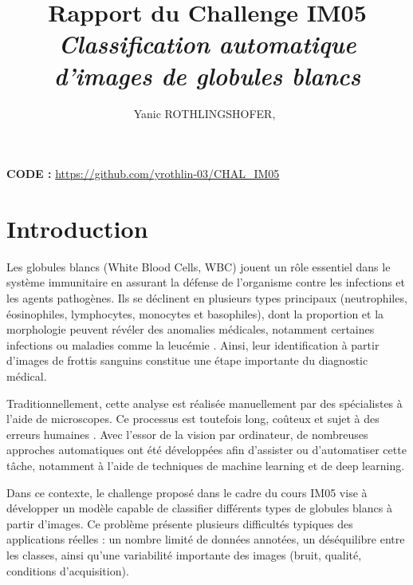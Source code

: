 \documentclass[journal,twocolumn]{IEEEtran}
\begin{document}
\title{Rapport du Challenge IM05 \\ \textit{Classification automatique d’images de globules blancs}}
\author{
  Yanic ROTHLINGSHOFER,~
}

\maketitle




\textbf{CODE :} \url{https://github.com/yrothlin-03/CHAL_IM05}

\section{Introduction}

Les globules blancs (White Blood Cells, WBC) jouent un rôle essentiel dans le système immunitaire en assurant la défense de l’organisme contre les infections et les agents pathogènes. Ils se déclinent en plusieurs types principaux (neutrophiles, éosinophiles, lymphocytes, monocytes et basophiles), dont la proportion et la morphologie peuvent révéler des anomalies médicales, notamment certaines infections ou maladies comme la leucémie \cite{TOGACAR2020106810,healthcare10112230}. Ainsi, leur identification à partir d’images de frottis sanguins constitue une étape importante du diagnostic médical.

Traditionnellement, cette analyse est réalisée manuellement par des spécialistes à l’aide de microscopes. Ce processus est toutefois long, coûteux et sujet à des erreurs humaines \cite{a16110525}. Avec l’essor de la vision par ordinateur, de nombreuses approches automatiques ont été développées afin d’assister ou d’automatiser cette tâche, notamment à l’aide de techniques de machine learning et de deep learning.

Dans ce contexte, le challenge proposé dans le cadre du cours IM05 vise à développer un modèle capable de classifier différents types de globules blancs à partir d’images. Ce problème présente plusieurs difficultés typiques des applications réelles : un nombre limité de données annotées, un déséquilibre entre les classes, ainsi qu’une variabilité importante des images (bruit, qualité, conditions d’acquisition).
\end{document}

